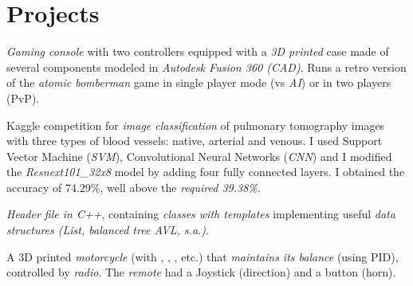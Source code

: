 %


\section{Projects}

{
\emph{Gaming console} with two controllers equipped with a \emph{3D printed} case made of several components modeled in \emph{Autodesk Fusion 360 (CAD)}. Runs a retro version of the \emph{atomic bomberman} game in single player mode (vs \emph{AI}) or in two players (PvP).
}

{
Kaggle competition for \emph{image classification} of pulmonary tomography images with three types of blood vessels: native, arterial and venous. I used Support Vector Machine (\emph{SVM}), Convolutional Neural Networks (\emph{CNN}) and I modified the \emph{Resnext101\_32x8} model by adding four fully connected layers. I obtained the accuracy of {74.29\%}, well above the \emph{required 39.38\%}.
}

{
\emph{Header file in C++}, containing \emph{classes with templates} implementing useful \emph{data structures (List, balanced tree AVL, s.a.)}.
}

{
A 3D printed \emph{motorcycle} (with , , , etc.) that \emph{maintains its balance} (using PID), controlled by \emph{radio}. The \emph{remote} had a Joystick (direction) and a button (horn).
}

